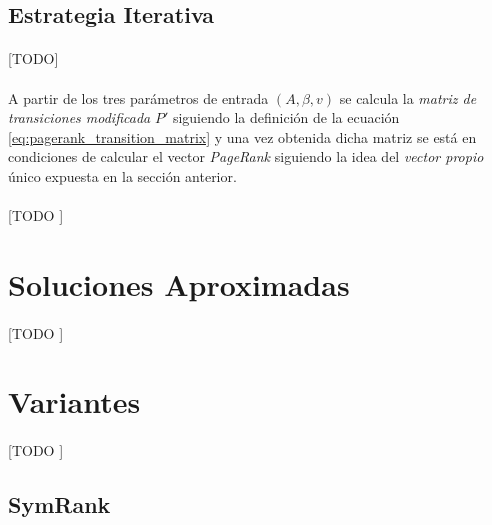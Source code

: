 \documentclass{subfiles}
\begin{document}
      \subsection{Estrategia Iterativa}
      \label{sec:pagerank_algorithm_iterative}

        \paragraph{}
        [TODO]

        \paragraph{}
        A partir de los tres parámetros de entrada $(A, \beta, v)$ se calcula la \emph{matriz de transiciones modificada} $P'$ siguiendo la definición de la ecuación \eqref{eq:pagerank_transition_matrix} y una vez obtenida dicha matriz se está en condiciones de calcular el vector \emph{PageRank} siguiendo la idea del \emph{vector propio} único expuesta en la sección anterior.


        \paragraph{}
        [TODO ]

    \section{Soluciones Aproximadas}
    \label{sec:pagerank_algorithm_approximated}

      \paragraph{}
      [TODO ]

      \section{Variantes}
      \label{sec:pagerank_variants}

        \paragraph{}
        [TODO ]

        \subsection{SymRank}
        \label{sec:symrank}
\end{document}

